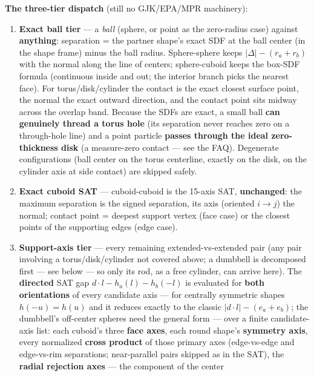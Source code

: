 \documentclass[11pt]{article}
\begin{document}
\textbf{The three-tier dispatch} (still no GJK/EPA/MPR machinery):
\begin{enumerate}
\item \textbf{Exact ball tier} --- a \emph{ball} (sphere, or point as the
      zero-radius case) against \textbf{anything}: separation = the partner
      shape's exact SDF at the ball center (in the shape frame) minus the
      ball radius. Sphere-sphere keeps $|\Delta| - (r_a + r_b)$ with the
      normal along the line of centers; sphere-cuboid keeps the box-SDF
      formula (continuous inside and out; the interior branch picks the
      nearest face). For torus/disk/cylinder the contact is the exact
      closest surface point, the normal the exact outward direction, and
      the contact point sits midway across the overlap band. Because the
      SDFs are exact, a small ball \textbf{can genuinely thread a torus
      hole} (its separation never reaches zero on a through-hole line) and
      a point particle \textbf{passes through the ideal zero-thickness
      disk} (a measure-zero contact --- see the FAQ). Degenerate
      configurations (ball center on the torus centerline, exactly on the
      disk, on the cylinder axis at side contact) are skipped safely.
\item \textbf{Exact cuboid SAT} --- cuboid-cuboid is the 15-axis SAT,
      \textbf{unchanged}: the maximum separation is the signed separation,
      its axis (oriented $i \to j$) the normal; contact point = deepest
      support vertex (face case) or the closest points of the supporting
      edges (edge case).
\item \textbf{Support-axis tier} --- every remaining extended-vs-extended
      pair (any pair involving a torus/disk/cylinder not covered above; a
      dumbbell is decomposed first --- see below --- so only its rod, as a
      free cylinder, can arrive here). The \textbf{directed} SAT gap
      $d \cdot l - h_a(l) - h_b(-l)$ is evaluated for \textbf{both
      orientations} of every candidate axis --- for centrally symmetric
      shapes $h(-u) = h(u)$ and it reduces exactly to the classic
      $|d \cdot l| - (e_a + e_b)$; the dumbbell's off-center spheres need
      the general form --- over a
      finite candidate-axis list: each cuboid's three \textbf{face axes},
      each round shape's \textbf{symmetry axis}, every normalized
      \textbf{cross product} of those primary axes (edge-vs-edge and
      edge-vs-rim separations; near-parallel pairs skipped as in the SAT),
      the \textbf{radial rejection axes} --- the component of the center

\end{enumerate}
\end{document}
